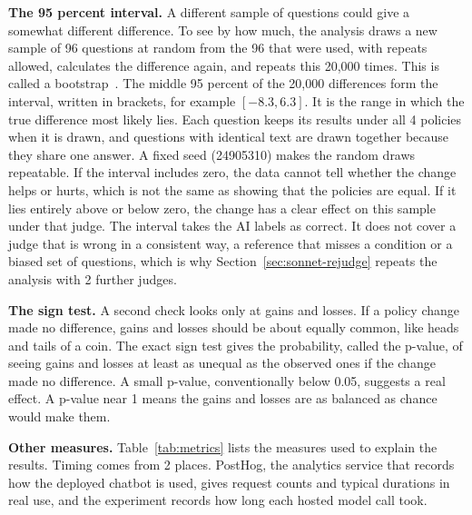 \textbf{The 95 percent interval.} A different sample of questions could give a somewhat different difference. To see by how much, the analysis draws a new sample of 96 questions at random from the 96 that were used, with repeats allowed, calculates the difference again, and repeats this 20,000 times. This is called a bootstrap~\cite{efron1993bootstrap}. The middle 95 percent of the 20,000 differences form the interval, written in brackets, for example $[-8.3, 6.3]$. It is the range in which the true difference most likely lies. Each question keeps its results under all 4 policies when it is drawn, and questions with identical text are drawn together because they share one answer. A fixed seed (24905310) makes the random draws repeatable. If the interval includes zero, the data cannot tell whether the change helps or hurts, which is not the same as showing that the policies are equal. If it lies entirely above or below zero, the change has a clear effect on this sample under that judge. The interval takes the AI labels as correct. It does not cover a judge that is wrong in a consistent way, a reference that misses a condition or a biased set of questions, which is why Section~\ref{sec:sonnet-rejudge} repeats the analysis with 2 further judges.

\textbf{The sign test.} A second check looks only at gains and losses. If a policy change made no difference, gains and losses should be about equally common, like heads and tails of a coin. The exact sign test gives the probability, called the p-value, of seeing gains and losses at least as unequal as the observed ones if the change made no difference. A small p-value, conventionally below 0.05, suggests a real effect. A p-value near 1 means the gains and losses are as balanced as chance would make them.

\textbf{Other measures.} Table~\ref{tab:metrics} lists the measures used to explain the results. Timing comes from 2 places. PostHog, the analytics service that records how the deployed chatbot is used, gives request counts and typical durations in real use, and the experiment records how long each hosted model call took.

